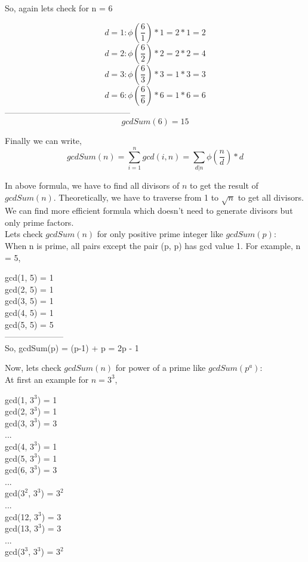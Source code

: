 \documentclass[a4paper,12pt]{article}
\begin{document}
\bigskip
\bigskip
\bigskip

So, again lets check for n = 6
\begin{center}
$$d = 1: \phi(\frac{6}{1}) * 1 = 2 * 1 = 2$$
$$d = 2: \phi(\frac{6}{2}) * 2 = 2 * 2 = 4$$
$$d = 3: \phi(\frac{6}{3}) * 3 = 1 * 3 = 3$$
$$d = 6: \phi(\frac{6}{6}) * 6 = 1 * 6 = 6$$
---------------------------------------------
$$gcdSum(6) = 15$$
\end{center}

Finally we can write,
$$gcdSum(n) = \sum_{i=1}^n gcd(i, n) = \sum_{d|n} \phi(\frac{n}{d}) * d$$
 
In above formula, we have to find all divisors of $n$ to get the result of $gcdSum(n)$. Theoretically, we have to traverse from 1 to $\sqrt{n}$ to get all divisors. We can find more efficient formula which doesn't need to generate divisors but only prime factors.\\


Lets check $gcdSum(n)$ for only positive prime integer like $gcdSum(p)$:\\ 
When n is prime, all pairs except the pair (p, p) has gcd value 1. For example, n = 5,
\begin{center}
gcd(1, 5) = 1\\
gcd(2, 5) = 1\\
gcd(3, 5) = 1\\
gcd(4, 5) = 1\\
gcd(5, 5) = 5\\
---------------------\\
So, gcdSum(p) = (p-1) + p = 2p - 1
\end{center}

Now, lets check $gcdSum(n)$ for power of a prime like $gcdSum(p^a)$:\\
At first an example for $n = 3^3$,

\begin{center}
gcd(1, $3^3$) = 1\\
gcd(2, $3^3$) = 1\\
gcd(3, $3^3$) = 3\\
...\\
gcd(4, $3^3$) = 1\\
gcd(5, $3^3$) = 1\\
gcd(6, $3^3$) = 3\\
...\\
gcd($3^2$, $3^3$) = $3^2$\\
...\\
gcd(12, $3^3$) = 3\\
gcd(13, $3^3$) = 3\\
...\\
gcd($3^3$, $3^3$) = $3^2$\\
\end{center} 
\end{document}
